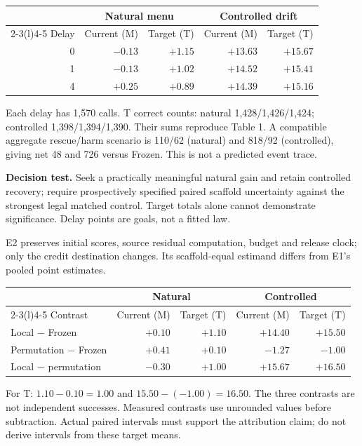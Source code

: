 \documentclass[10pt,letterpaper]{article}
\newcommand{\T}[1]{{\color{GuideBlue}#1}}
\newcommand{\note}[1]{{\fontsize{8.5}{10.5}\selectfont #1\par}}
\newcommand{\sectionhead}[1]{\vspace{7pt}{\large\bfseries #1}\par\vspace{3pt}}
\newenvironment{clean}{\begin{center}\fontsize{9.5}{11.5}\selectfont\setlength{\tabcolsep}{8pt}\renewcommand{\arraystretch}{1.10}}{\end{center}}
\begin{document}
\begin{clean}
\begin{tabular}{@{}rrrrr@{}}
\toprule
& \multicolumn{2}{c}{Natural menu} & \multicolumn{2}{c}{Controlled drift} \\
\cmidrule(lr){2-3}\cmidrule(l){4-5}
Delay & Current (M) & Target (T) & Current (M) & Target (T) \\
\midrule
0 & $-0.13$ & \T{$+1.15$} & $+13.63$ & \T{$+15.67$} \\
1 & $-0.13$ & \T{$+1.02$} & $+14.52$ & \T{$+15.41$} \\
4 & $+0.25$ & \T{$+0.89$} & $+14.39$ & \T{$+15.16$} \\

\bottomrule
\end{tabular}
\end{clean}
\note{Each delay has 1,570 calls. T correct counts: natural 1,428/1,426/1,424; controlled 1,398/1,394/1,390. Their sums reproduce Table 1. A compatible aggregate rescue/harm scenario is 110/62 (natural) and 818/92 (controlled), giving net 48 and 726 versus Frozen. This is not a predicted event trace.}
\textbf{Decision test.} Seek a practically meaningful natural gain and retain controlled recovery; require prospectively specified paired scaffold uncertainty against the strongest legal matched control. Target totals alone cannot demonstrate significance. Delay points are goals, not a fitted law.

\newpage
\sectionhead{2. Mechanism and learnable headroom}
E2 preserves initial scores, source residual computation, budget and release clock; only the credit destination changes. Its scaffold-equal estimand differs from E1's pooled point estimates.
\begin{clean}
\begin{tabular}{@{}lrrrr@{}}
\toprule
& \multicolumn{2}{c}{Natural} & \multicolumn{2}{c}{Controlled} \\
\cmidrule(lr){2-3}\cmidrule(l){4-5}
Contrast & Current (M) & Target (T) & Current (M) & Target (T) \\
\midrule
Local $-$ Frozen & $+0.10$ & \T{$+1.10$} & $+14.40$ & \T{$+15.50$} \\
Permutation $-$ Frozen & $+0.41$ & \T{$+0.10$} & $-1.27$ & \T{$-1.00$} \\
Local $-$ permutation & $-0.30$ & \T{$+1.00$} & $+15.67$ & \T{$+16.50$} \\

\bottomrule
\end{tabular}
\end{clean}
\note{For T: $1.10-0.10=1.00$ and $15.50-(-1.00)=16.50$. The three contrasts are not independent successes. Measured contrasts use unrounded values before subtraction. Actual paired intervals must support the attribution claim; do not derive intervals from these target means.}
\end{document}
